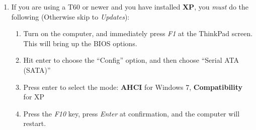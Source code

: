 \documentclass[10pt]{article}
\begin{document}
\begin{enumerate}
\item If you are using a T60 or newer and you have installed {\bf XP}, you \emph{must} do the following (Otherwise skip to \emph{Updates}):
\begin{enumerate} %
\item Turn on the computer, and immediately press \emph{F1} at the ThinkPad screen. This will bring up the BIOS options.
\item Hit enter to choose the ``Config'' option, and then choose ``Serial ATA (SATA)''
\item Press enter to select the mode: {\bf AHCI} for Windows 7, {\bf Compatibility} for XP
\item Press the \emph{F10} key, press \emph{Enter} at confirmation, and the computer will restart.
\end{enumerate} %
\end{enumerate}


\end{document}
